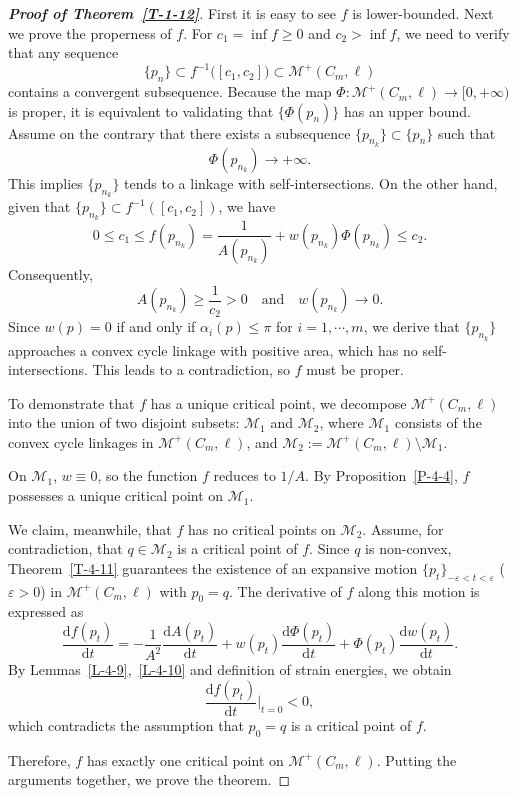 \documentclass[11pt,letterpaper]{amsart}
\theoremstyle{plain}
\theoremstyle{definition}
\theoremstyle{remark}
\numberwithin{equation}{section}
\begin{document}
\begin{proof}[\textbf{Proof of Theorem~\ref{T-1-12}}]
First it is easy to see $f$ is lower-bounded. Next we prove the properness of $f$. For $c_1=\inf f\geq 0$ and $c_2>\inf f$, we need to verify that any sequence
\[
\{p_n\}\subset f^{-1}\big([c_1,c_2]\big)\subset \mathcal M^{+}(C_m,\ell)
\]
contains a convergent subsequence.
Because the map $\Phi:\mathcal M^{+}(C_m,\ell)\to [0,+\infty)$ is proper, it is equivalent to validating that $\big\{\Phi(p_n)\big\}$ has an upper bound.
Assume on the contrary that there exists a subsequence $\{p_{n_k}\}\subset \{p_n\}$ such that
\[
\Phi(p_{n_k})\to+\infty.
\]
This implies $\{p_{n_k}\}$ tends to a linkage with self-intersections. On the other hand, given that $\{p_{n_k}\}\subset f^{-1}([c_1,c_2])$, we have
\[
0\leq c_1\leq f(p_{n_k})=\frac{1}{A(p_{n_k})}+w(p_{n_k})\Phi(p_{n_k})\leq c_2.
\]
Consequently,
\[
A(p_{n_k})\geq \frac{1}{c_2}>0\quad\text{and}\quad w(p_{n_k})\to 0.
\]
Since $w(p)=0$ if and only if $\alpha_i(p)\leq \pi$ for $i=1,\cdots,m$, we derive that $\{p_{n_k}\}$ approaches a convex cycle linkage with positive area, which has no self-intersections. This leads to a contradiction, so $f$ must be proper.


To demonstrate that $f$ has a unique critical point, we decompose
$\mathcal M^{+}(C_m,\ell)$ into the union of two disjoint subsets:
$\mathcal M_1$ and $\mathcal M_2$, where
$\mathcal M_1$ consists of the convex cycle linkages in $\mathcal M^{+}(C_m,\ell)$, and $\mathcal M_2:=\mathcal M^{+}(C_m,\ell)\setminus\mathcal M_1$.

On $\mathcal M_1$, $w\equiv 0$, so the function $f$ reduces to $\displaystyle{1/A}$. By Proposition~\ref{P-4-4}, $f$ possesses a unique critical point on $\mathcal M_1$.

We claim, meanwhile, that $f$ has no critical points on $\mathcal M_2$. Assume, for contradiction, that $q\in \mathcal M_2$ is a critical point of $f$. Since $q$ is  non-convex, Theorem~\ref{T-4-11} guarantees the existence of an expansive motion $\{p_t\}_{-\varepsilon<t<\varepsilon}$ ($\varepsilon>0$) in $\mathcal M^{+}(C_m,\ell)$ with $p_0=q$. The derivative of $f$ along this motion is expressed as
\[
\frac{\mathrm{d}f(p_t)}{\mathrm{d}t}=
-\frac{1}{A^2}\frac{\mathrm{d}A(p_t)}{\mathrm{d}t}
+w(p_t)\frac{\mathrm{d}\Phi(p_t)}{\mathrm{d}t}+\Phi(p_t)\frac{\mathrm{d}w(p_t)}{\mathrm{d}t}.
\]
By Lemmas~\ref{L-4-9},~\ref{L-4-10} and definition of strain energies, we obtain
\[
\frac{\mathrm{d}f(p_t)}{\mathrm{d}t}\bigg|_{t=0}<0,
\]
which contradicts the assumption that $p_0=q$ is a critical point of $f$.

Therefore, $f$ has exactly one critical point on
$\mathcal M^{+}(C_m,\ell)$. Putting the arguments together, we prove the theorem.
\end{proof}
\end{document}
